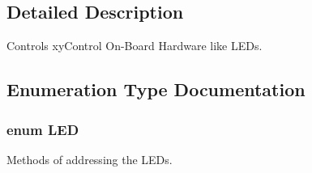\subsection{Detailed Description}
Controls xy\-Control On-\/\-Board Hardware like L\-E\-Ds. 

\subsection{Enumeration Type Documentation}
\hypertarget{group__xycontrol_gaadcb6002d2b42fdfe01490f730ab00a6}{
\subsubsection[{L\-E\-D}]{\setlength{\rightskip}{0pt plus 5cm}enum {\bf L\-E\-D}}}\label{group__xycontrol_gaadcb6002d2b42fdfe01490f730ab00a6}


Methods of addressing the L\-E\-Ds. 

